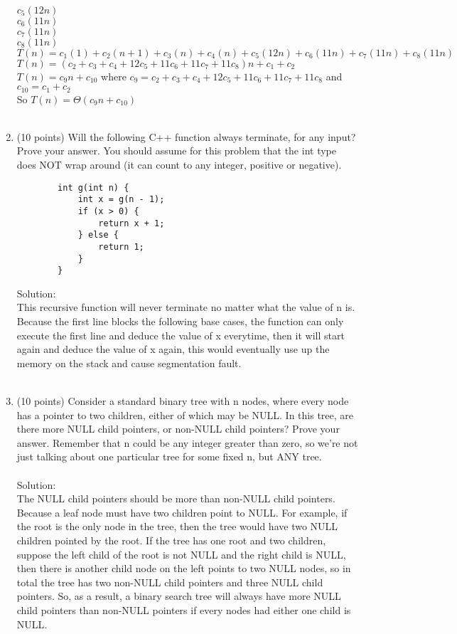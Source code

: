 \documentclass[12pt]{article}
\begin{document}
\begin{enumerate}
	\\$c_5(12n)$
	\\$c_6(11n)$
	\\$c_7(11n)$
	\\$c_8(11n)$
	\\$T(n) = c_1(1) +c_2(n+1)+c_3(n)+c_4(n)+c_5(12n)+c_6(11n)+c_7(11n)+c_8(11n)$
	\\$T(n) = (c_2+c_3+c_4+12c_5+11c_6+11c_7+11c_8)n +c_1+c_2$
	\\$T(n) = c_9n+c_{10}$ where $c_9 =c_2+c_3+c_4+12c_5+11c_6+11c_7+11c_8$ and $c_{10}=c_1+c_2$
	\\So $T(n) = \Theta(c_9n+c_{10})$
	\\\\

\item (10 points) Will the following C++ function always terminate, for any input? 
Prove your answer. You should assume for this problem that the int type does NOT 
wrap around (it can count to any integer, positive or negative). 

	\begin{verbatim}
		int g(int n) {
		    int x = g(n - 1);
		    if (x > 0) {
		        return x + 1;
		    } else {
		        return 1;
		    }
		}
	\end{verbatim}
Solution:
\\This recursive function will never terminate no matter what the value of  n is. Because the first line blocks the following base cases, the function can only execute the first line and deduce the value of x everytime, then it will start again and deduce the value of x again, this would eventually use up the memory on the stack and cause segmentation fault.
\\\\

\item (10 points) Consider a standard binary tree with n nodes, where every node has a 
pointer to two children, either of which may be NULL. In this tree, are there more NULL 
child pointers, or non-NULL child pointers? Prove your answer. Remember that n could 
be any integer greater than zero, so we're not just talking about one particular tree for 
some fixed n, but ANY tree. 
\\\\Solution:
\\The NULL child pointers should be more than non-NULL child pointers. Because a leaf node must have two children point to NULL. For example, if the root is the only node in the tree, then the tree would have two NULL children pointed by the root. If the tree has one root and two children, suppose the left child of the root is not NULL and the right child is NULL, then there is another child node on the left points to two NULL nodes, so in total the tree has two non-NULL child pointers and three NULL child pointers. So, as a result, a binary search tree will always have more NULL child pointers than non-NULL pointers if every nodes had either one child is NULL.
\\\\


\end{enumerate}
\end{document}
